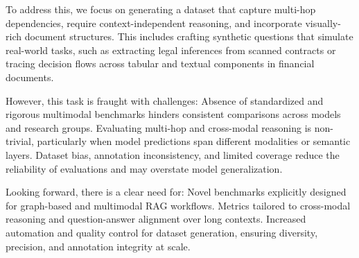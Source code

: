 \documentclass[12pt,twoside]{report}
\begin{document}
To address this, we focus on generating a dataset that capture multi-hop dependencies, require context-independent reasoning, and incorporate visually-rich document structures. This includes crafting synthetic questions that simulate real-world tasks, such as extracting legal inferences from scanned contracts or tracing decision flows across tabular and textual components in financial documents.

However, this task is fraught with challenges:
Absence of standardized and rigorous multimodal benchmarks hinders consistent comparisons across models and research groups.
Evaluating multi-hop and cross-modal reasoning is non-trivial, particularly when model predictions span different modalities or semantic layers.
Dataset bias, annotation inconsistency, and limited coverage reduce the reliability of evaluations and may overstate model generalization.

Looking forward, there is a clear need for:
Novel benchmarks explicitly designed for graph-based and multimodal RAG workflows.
Metrics tailored to cross-modal reasoning and question-answer alignment over long contexts. Increased automation and quality control for dataset generation, ensuring diversity, precision, and annotation integrity at scale.
\end{document}
